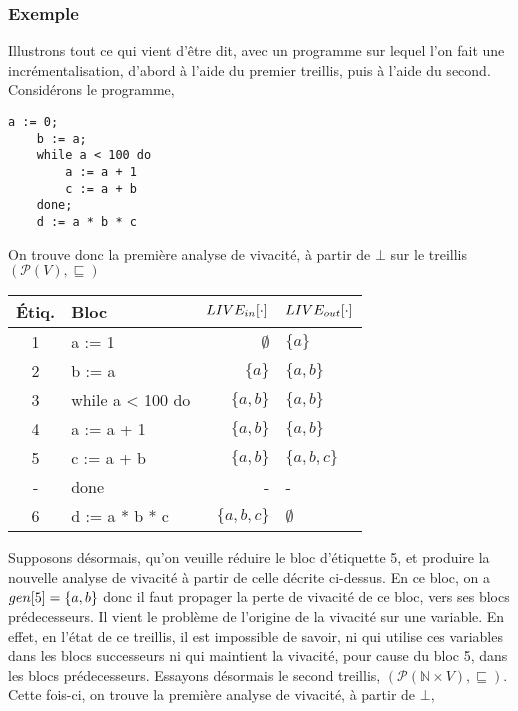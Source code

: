 \documentclass[a4paper, 12pt]{article}
\begin{document}
\subsubsection{Exemple}
Illustrons tout ce qui vient d'être dit, avec un programme sur lequel l'on fait une incrémentalisation, d'abord à l'aide du premier
treillis, puis à l'aide du second. Considérons le programme,
\begin{lstlisting}[tabsize=2]
	a := 0;
	b := a;
	while a < 100 do
		a := a + 1
		c := a + b
	done;
	d := a * b * c
\end{lstlisting}
On trouve donc la première analyse de vivacité, à partir de $\bot$ sur le treillis $(\mathcal{P}(V), \sqsubseteq)$
\begin{center}
	\begin{tabular}{||c|l|r|l||}
	\hline
	Étiq. & Bloc & $LIVE_{in}[\cdot]$ & $LIVE_{out}[\cdot]$ \\
	\hline
	1 & a := 1 & $\emptyset$ & $\{a\}$\\
	2 & b := a & $\{a\}$ & $\{a, b\}$\\
	3 & while a < 100 do & $\{a, b\}$ & $\{a, b\}$\\
	4 & a := a + 1 & $\{a, b\}$ & $\{a, b\}$\\
	5 & c := a + b & $\{a, b\}$ & $\{a, b, c\}$\\
	- & done & - & -\\
	6 & d := a * b * c & $\{a, b, c\}$ & $\emptyset$\\
	\hline
	\end{tabular}
\end{center}
Supposons désormais, qu'on veuille réduire le bloc d'étiquette 5, et produire la nouvelle analyse de vivacité
à partir de celle décrite ci-dessus. En ce bloc, on a $gen[5] = \{a, b\}$ donc il faut propager la perte de vivacité
de ce bloc, vers ses blocs prédecesseurs. Il vient le problème de l'origine de la vivacité sur une variable. En effet,
en l'état de ce treillis, il est impossible de savoir, ni qui utilise ces variables dans les blocs successeurs ni qui
maintient la vivacité, pour cause du bloc 5, dans les blocs prédecesseurs. Essayons désormais le second treillis, 
$(\mathcal{P}(\mathbb{N} \times V), \sqsubseteq)$. Cette fois-ci, on trouve la première analyse de vivacité, à partir
de $\bot$,
\end{document}
